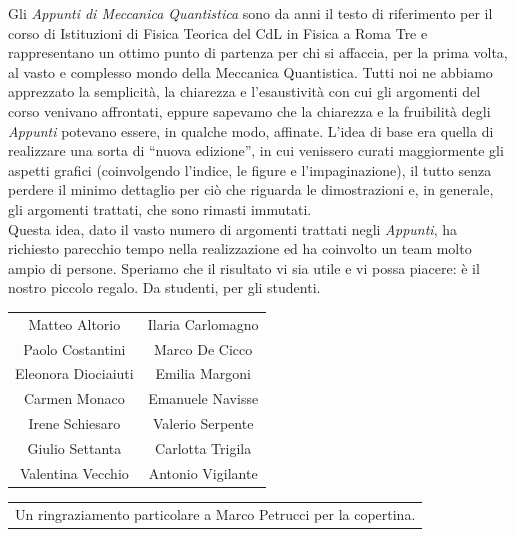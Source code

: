 \setcounter{page}{3}
\facciatabianca
\thispagestyle{empty}
\setcounter{page}{3}
\begin{center}
\end{center}
Gli \textit{Appunti di Meccanica Quantistica} sono da anni il testo di riferimento per il corso di Istituzioni di Fisica Teorica del CdL in Fisica a Roma Tre e rappresentano un ottimo punto di partenza per chi si affaccia, per la prima volta, al vasto e complesso mondo della Meccanica Quantistica. Tutti noi ne abbiamo apprezzato la semplicità, la chiarezza e l'esaustività con cui gli argomenti del corso venivano affrontati, eppure sapevamo che la chiarezza e la fruibilità degli \textit{Appunti} potevano  essere, in qualche modo, affinate. L'idea di base era quella di realizzare una sorta di ``nuova edizione'',  in cui venissero curati maggiormente gli aspetti grafici (coinvolgendo l'indice, le figure e l'impaginazione), il tutto senza perdere il minimo dettaglio per ciò che riguarda le dimostrazioni e, in generale, gli argomenti trattati, che sono rimasti immutati.\\
Questa idea, dato il vasto numero di argomenti trattati negli \textit{Appunti}, ha richiesto parecchio tempo nella realizzazione ed ha coinvolto un team molto ampio di persone. Speriamo che il risultato vi sia utile e vi possa piacere: è il nostro piccolo regalo. Da studenti, per gli studenti.\\
\begin{table}[!htbp]
\begin{center}
\begin{tabular}{cc}
Matteo Altorio & Ilaria Carlomagno \\
Paolo Costantini & Marco De Cicco \\
Eleonora Diociaiuti & Emilia Margoni \\
Carmen Monaco & Emanuele Navisse \\
Irene Schiesaro & Valerio Serpente \\
Giulio Settanta & Carlotta Trigila \\
Valentina Vecchio & Antonio Vigilante
\end{tabular}
\end{center}
\end{table}
\begin{table}[!htbp]
\begin{tabular}{c}
Un ringraziamento particolare a Marco Petrucci per la copertina.
\end{tabular}
\end{table}
